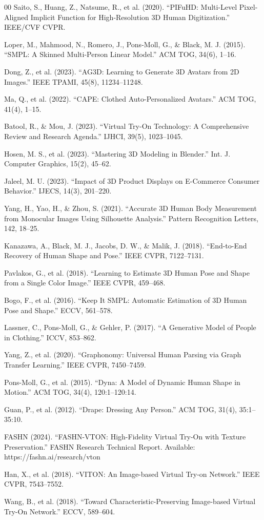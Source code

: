 \documentclass[conference]{IEEEtran}
\begin{document}
\begin{thebibliography}{00}
 Saito, S., Huang, Z., Natsume, R., et al. (2020). ``PIFuHD: Multi-Level Pixel-Aligned Implicit Function for High-Resolution 3D Human Digitization.'' IEEE/CVF CVPR.

 Loper, M., Mahmood, N., Romero, J., Pons-Moll, G., \& Black, M. J. (2015). ``SMPL: A Skinned Multi-Person Linear Model.'' ACM TOG, 34(6), 1--16.

 Dong, Z., et al. (2023). ``AG3D: Learning to Generate 3D Avatars from 2D Images.'' IEEE TPAMI, 45(8), 11234--11248.

 Ma, Q., et al. (2022). ``CAPE: Clothed Auto-Personalized Avatars.'' ACM TOG, 41(4), 1--15.

 Batool, R., \& Mou, J. (2023). ``Virtual Try-On Technology: A Comprehensive Review and Research Agenda.'' IJHCI, 39(5), 1023--1045.

 Hosen, M. S., et al. (2023). ``Mastering 3D Modeling in Blender.'' Int. J. Computer Graphics, 15(2), 45--62.

 Jaleel, M. U. (2023). ``Impact of 3D Product Displays on E-Commerce Consumer Behavior.'' IJECS, 14(3), 201--220.

 Yang, H., Yao, H., \& Zhou, S. (2021). ``Accurate 3D Human Body Measurement from Monocular Images Using Silhouette Analysis.'' Pattern Recognition Letters, 142, 18--25.

 Kanazawa, A., Black, M. J., Jacobs, D. W., \& Malik, J. (2018). ``End-to-End Recovery of Human Shape and Pose.'' IEEE CVPR, 7122--7131.

 Pavlakos, G., et al. (2018). ``Learning to Estimate 3D Human Pose and Shape from a Single Color Image.'' IEEE CVPR, 459--468.

 Bogo, F., et al. (2016). ``Keep It SMPL: Automatic Estimation of 3D Human Pose and Shape.'' ECCV, 561--578.

 Lassner, C., Pons-Moll, G., \& Gehler, P. (2017). ``A Generative Model of People in Clothing.'' ICCV, 853--862.

 Yang, Z., et al. (2020). ``Graphonomy: Universal Human Parsing via Graph Transfer Learning.'' IEEE CVPR, 7450--7459.

 Pons-Moll, G., et al. (2015). ``Dyna: A Model of Dynamic Human Shape in Motion.'' ACM TOG, 34(4), 120:1--120:14.

 Guan, P., et al. (2012). ``Drape: Dressing Any Person.'' ACM TOG, 31(4), 35:1--35:10.

 FASHN (2024). ``FASHN-VTON: High-Fidelity Virtual Try-On with Texture Preservation.'' FASHN Research Technical Report. Available: https://fashn.ai/research/vton

 Han, X., et al. (2018). ``VITON: An Image-based Virtual Try-on Network.'' IEEE CVPR, 7543--7552.

 Wang, B., et al. (2018). ``Toward Characteristic-Preserving Image-based Virtual Try-On Network.'' ECCV, 589--604.

\end{thebibliography}
\end{document}

